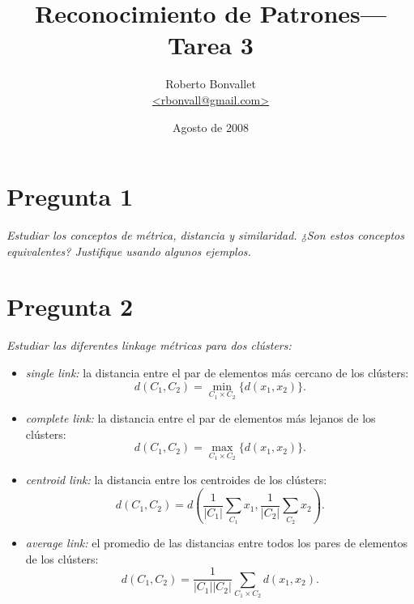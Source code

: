 \documentclass[spanish]{article}
\title{Reconocimiento de Patrones---Tarea 3}
\author{Roberto Bonvallet \\ \url {<rbonvall@gmail.com>}}
\date{Agosto de 2008}
\newcommand{\pregunta}{\textit}
\newcommand{\card}[1]{\lvert#1\rvert}
\begin{document}
\maketitle

\section*{Pregunta 1}
\pregunta{
    Estudiar los conceptos de métrica, distancia y similaridad.
    ¿Son estos conceptos equivalentes?
    Justifique usando algunos ejemplos.
}



\section*{Pregunta 2}
\pregunta{Estudiar las diferentes linkage métricas para dos clústers:}
\begin{itemize}
    \item \pregunta{single link:} la distancia entre el par de elementos más cercano de los
        clústers:
        \[d(C_1, C_2) = \min_{C_1\times C_2}\bigl\{d(x_1, x_2)\bigr\}.\]
    \item \pregunta{complete link:} la distancia entre el par de elementos más lejanos de los
        clústers:
        \[d(C_1, C_2) = \max_{C_1\times C_2}\bigl\{d(x_1, x_2)\bigr\}.\]
    \item \pregunta{centroid link:} la distancia entre los centroides de los clústers:
        \[d(C_1, C_2) = d\left(\frac{1}{\card{C_1}}\sum_{C_1} x_1, \frac{1}{\card{C_2}}\sum_{C_2} x_2\right).\]
    \item \pregunta{average link:} el promedio de las distancias entre todos los pares de elementos
        de los clústers:
        \[d(C_1, C_2) = \frac{1}{\card{C_1}\card{C_2}}\sum_{C_1\times C_2} d(x_1, x_2).\]
\end{itemize}
\end{document}
